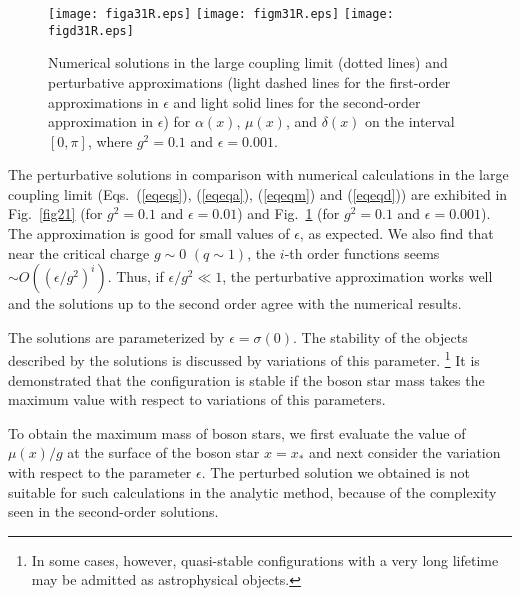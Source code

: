\documentclass[
aps,prd,
12pt,%
nopreprintnumbers,
showpacs,
eqsecnum,
nofootinbib
]{revtex4-1}
\begin{document}
\begin{figure}[ht]
\centering
\texttt{[image: figa31R.eps]}
\texttt{[image: figm31R.eps]}
\texttt{[image: figd31R.eps]}
\caption{
Numerical solutions in the large coupling limit (dotted lines) and perturbative
approximations (light dashed lines for the first-order approximations in $\epsilon$
and light solid lines for the second-order approximation in $\epsilon$) for
$\alpha(x)$,
$\mu(x)$, and
$\delta(x)$ on the
interval $[0,
\pi]$, where $g^2=0.1$ and $\epsilon=0.001$.}
\label{fig31}
\end{figure}

The perturbative solutions in comparison with numerical calculations in the
large coupling limit (Eqs.~(\ref{eqeqs}), (\ref{eqeqa}), (\ref{eqeqm}) and
(\ref{eqeqd})) are exhibited in Fig.~\ref{fig21} (for
$g^2=0.1$ and
$\epsilon=0.01$) and Fig.~\ref{fig31} (for $g^2=0.1$ and $\epsilon=0.001$).  
The approximation is good for small values of $\epsilon$, as expected.
We also find that near the critical charge $g\sim 0$ $(q\sim 1)$,
the $i$-th order functions seems $\sim\! O((\epsilon/g^2)^i)$.
Thus, if $\epsilon/g^2\ll1$, the perturbative approximation works well
and the solutions up to the second order agree with the numerical results. 

The solutions are parameterized by
 $\epsilon=\sigma(0)$.
The stability of the objects described by the solutions is discussed
by variations of this parameter.%
\footnote{In some cases, however, quasi-stable configurations with a very long
lifetime may be admitted as astrophysical objects.} 
It is
demonstrated that the configuration is stable if the boson star mass takes
the maximum value with respect to variations of this parameters.

To obtain the maximum mass of boson stars, we first evaluate the value of
$\mu(x)/g$ at the surface of the boson star $x=x_*$ and next consider the
variation with respect to the parameter $\epsilon$.
The perturbed solution we obtained is not suitable for such calculations in
the analytic method, because of the complexity seen in the second-order solutions.

\end{document}
